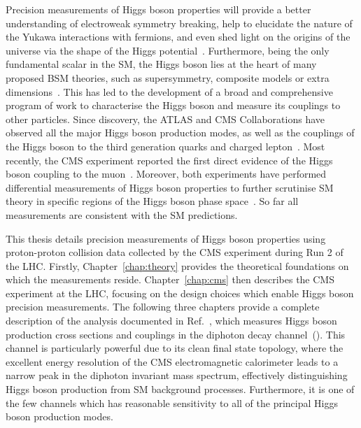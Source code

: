 Precision measurements of Higgs boson properties will provide a better understanding of electroweak symmetry breaking, help to elucidate the nature of the Yukawa interactions with fermions, and even shed light on the origins of the universe via the shape of the Higgs potential~\cite{Kajantie:1995kf,Csikor:1998eu}. Furthermore, being the only fundamental scalar in the SM, the Higgs boson lies at the heart of many proposed BSM theories, such as supersymmetry, composite models or extra dimensions~\cite{Martin:1997ns,Witzel:2019jbe,Quiros:2013yaa}. This has led to the development of a broad and comprehensive program of work to characterise the Higgs boson and measure its couplings to other particles. Since discovery, the ATLAS and CMS Collaborations have observed all the major Higgs boson production modes, as well as the couplings of the Higgs boson to the third generation quarks and charged lepton~\cite{Aaboud:2018urx,Aaboud:2018zhk,Aaboud:2018pen,Sirunyan:2018hoz,Sirunyan:2018kst,Sirunyan:2017khh}. Most recently, the CMS experiment reported the first direct evidence of the Higgs boson coupling to the muon~\cite{Sirunyan:2020two}. Moreover, both experiments have performed differential measurements of Higgs boson properties to further scrutinise SM theory in specific regions of the Higgs boson phase space~\cite{ATLAS:2020wny,ATLAS-CONF-2019-029,Aad:2020jym,Sirunyan:2020hwz,Sirunyan:2020tzo}. So far all measurements are consistent with the SM predictions.

This thesis details precision measurements of Higgs boson properties using proton-proton collision data collected by the CMS experiment during Run 2 of the LHC. Firstly, Chapter~\ref{chap:theory} provides the theoretical foundations on which the measurements reside. Chapter~\ref{chap:cms} then describes the CMS experiment at the LHC, focusing on the design choices which enable Higgs boson precision measurements. The following three chapters provide a complete description of the analysis documented in Ref.~\cite{Sirunyan:2021ybb}, which measures Higgs boson production cross sections and couplings in the diphoton decay channel~(\Hgg). This channel is particularly powerful due to its clean final state topology, where the excellent energy resolution of the CMS electromagnetic calorimeter leads to a narrow peak in the diphoton invariant mass spectrum, effectively distinguishing Higgs boson production from SM background processes. Furthermore, it is one of the few channels which has reasonable sensitivity to all of the principal Higgs boson production modes. 

